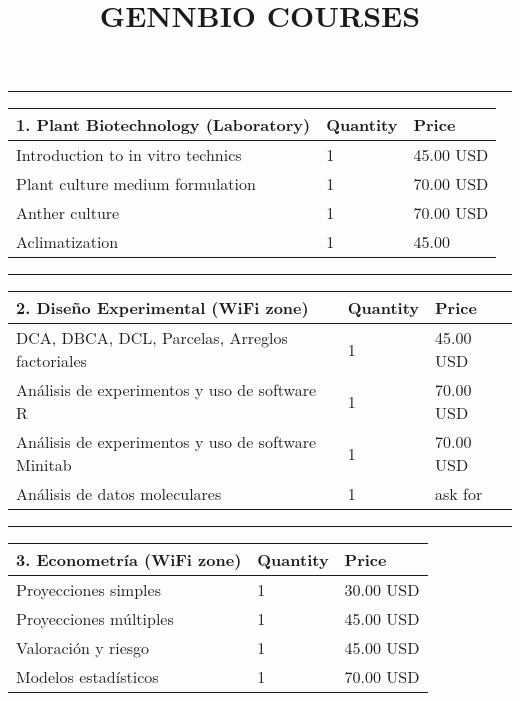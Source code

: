 \documentclass[
]{article}
\title{GENNBIO COURSES}
\author{}
\date{\vspace{-2.5em}}
\begin{document}
\maketitle

\begin{center}\rule{0.5\linewidth}{0.5pt}\end{center}

\begin{longtable}[]{@{}lll@{}}
\toprule
1. Plant Biotechnology (Laboratory) & Quantity & Price \\
\midrule
\endhead
Introduction to in vitro technics & 1 & 45.00 USD \\
Plant culture medium formulation & 1 & 70.00 USD \\
Anther culture & 1 & 70.00 USD \\
Aclimatization & 1 & 45.00 \\
\bottomrule
\end{longtable}

\begin{center}\rule{0.5\linewidth}{0.5pt}\end{center}

\begin{longtable}[]{@{}lll@{}}
\toprule
2. Diseño Experimental (WiFi zone) & Quantity & Price \\
\midrule
\endhead
DCA, DBCA, DCL, Parcelas, Arreglos factoriales & 1 & 45.00 USD \\
Análisis de experimentos y uso de software R & 1 & 70.00 USD \\
Análisis de experimentos y uso de software Minitab & 1 & 70.00 USD \\
Análisis de datos moleculares & 1 & ask for \\
\bottomrule
\end{longtable}

\begin{center}\rule{0.5\linewidth}{0.5pt}\end{center}

\begin{longtable}[]{@{}lll@{}}
\toprule
3. Econometría (WiFi zone) & Quantity & Price \\
\midrule
\endhead
Proyecciones simples & 1 & 30.00 USD \\
Proyecciones múltiples & 1 & 45.00 USD \\
Valoración y riesgo & 1 & 45.00 USD \\
Modelos estadísticos & 1 & 70.00 USD \\
\bottomrule
\end{longtable}
\end{document}
